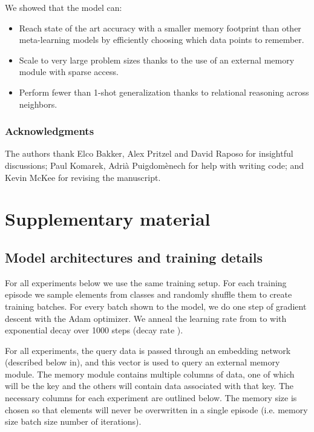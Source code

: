 \documentclass{article} \usepackage{iclr2019_conference,times}
\begin{document}
We showed that the model can:
\begin{itemize}
    \item Reach state of the art accuracy with a smaller memory footprint than other meta-learning models by efficiently choosing which data points to remember.
    \item Scale to very large problem sizes thanks to the use of an external memory module with sparse access.
    \item Perform fewer than 1-shot generalization thanks to relational reasoning across neighbors.
\end{itemize}

\subsubsection*{Acknowledgments}
The authors thank Elco Bakker, Alex Pritzel and David Raposo for insightful discussions; Paul Komarek, Adrià Puigdomènech for help with writing code; and Kevin McKee for revising the manuscript.




\newpage
\section{Supplementary material}

\subsection{Model architectures and training details}

For all experiments below we use the same training setup. For each training episode we sample elements from  classes and randomly shuffle them to create training batches. For every batch shown to the model, we do one step of gradient descent with the Adam optimizer. We anneal the learning rate from  to  with exponential decay over 1000 steps (decay rate ).

For all experiments, the query data is passed through an embedding network (described below in), and this vector is used to query an external memory module. The memory module contains multiple columns of data, one of which will be the key and the others will contain data associated with that key. The necessary columns for each experiment are outlined below. The memory size is chosen so that elements will never be overwritten in a single episode (i.e. memory size  batch size  number of iterations).
\end{document}

